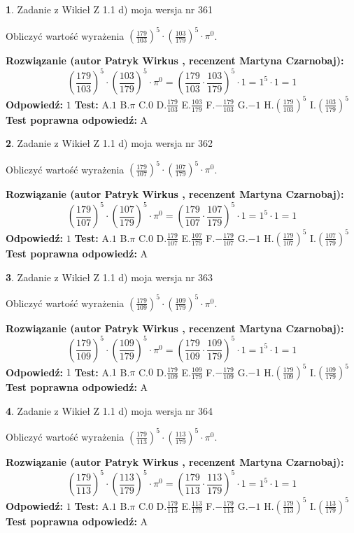 \documentclass[12pt, a4paper]{article}
\theoremstyle{definition} %
\newtheorem{zad}{}
\newcommand{\zadStart}[1]{\begin{zad}#1\newline}
\newcommand{\zadStop}{\end{zad}}
\newcommand{\rozwStart}[2]{\noindent \textbf{Rozwiązanie (autor #1 , recenzent #2): }\newline}
\newcommand{\rozwStop}{\newline}
\newcommand{\odpStart}{\noindent \textbf{Odpowiedź:}\newline}
\newcommand{\odpStop}{\newline}
\newcommand{\testStart}{\noindent \textbf{Test:}\newline}
\newcommand{\testStop}{\newline}
\newcommand{\kluczStart}{\noindent \textbf{Test poprawna odpowiedź:}\newline}
\newcommand{\kluczStop}{\newline}
\begin{document}
\zadStart{Zadanie z Wikieł Z 1.1 d) moja wersja nr 361}

Obliczyć wartość wyrażenia $(\frac{179}{103})^{5} \cdot (\frac{103}{179})^{5} \cdot \pi^{0}$.
\zadStop
\rozwStart{Patryk Wirkus}{Martyna Czarnobaj}
$$(\frac{179}{103})^{5} \cdot (\frac{103}{179})^{5} \cdot \pi^{0} = (\frac{179}{103} \cdot \frac{103}{179})^{5} \cdot 1 = 1^{5} \cdot 1 = 1$$
\rozwStop
\odpStart
$1$
\odpStop
\testStart
A.$1$ B.$\pi$ C.$0$ D.$\frac{179}{103}$ E.$\frac{103}{179}$
F.$-\frac{179}{103}$ G.$-1$
H.$(\frac{179}{103})^{5}$
I.$(\frac{103}{179})^{5}$
\testStop
\kluczStart
A
\kluczStop



\zadStart{Zadanie z Wikieł Z 1.1 d) moja wersja nr 362}

Obliczyć wartość wyrażenia $(\frac{179}{107})^{5} \cdot (\frac{107}{179})^{5} \cdot \pi^{0}$.
\zadStop
\rozwStart{Patryk Wirkus}{Martyna Czarnobaj}
$$(\frac{179}{107})^{5} \cdot (\frac{107}{179})^{5} \cdot \pi^{0} = (\frac{179}{107} \cdot \frac{107}{179})^{5} \cdot 1 = 1^{5} \cdot 1 = 1$$
\rozwStop
\odpStart
$1$
\odpStop
\testStart
A.$1$ B.$\pi$ C.$0$ D.$\frac{179}{107}$ E.$\frac{107}{179}$
F.$-\frac{179}{107}$ G.$-1$
H.$(\frac{179}{107})^{5}$
I.$(\frac{107}{179})^{5}$
\testStop
\kluczStart
A
\kluczStop



\zadStart{Zadanie z Wikieł Z 1.1 d) moja wersja nr 363}

Obliczyć wartość wyrażenia $(\frac{179}{109})^{5} \cdot (\frac{109}{179})^{5} \cdot \pi^{0}$.
\zadStop
\rozwStart{Patryk Wirkus}{Martyna Czarnobaj}
$$(\frac{179}{109})^{5} \cdot (\frac{109}{179})^{5} \cdot \pi^{0} = (\frac{179}{109} \cdot \frac{109}{179})^{5} \cdot 1 = 1^{5} \cdot 1 = 1$$
\rozwStop
\odpStart
$1$
\odpStop
\testStart
A.$1$ B.$\pi$ C.$0$ D.$\frac{179}{109}$ E.$\frac{109}{179}$
F.$-\frac{179}{109}$ G.$-1$
H.$(\frac{179}{109})^{5}$
I.$(\frac{109}{179})^{5}$
\testStop
\kluczStart
A
\kluczStop



\zadStart{Zadanie z Wikieł Z 1.1 d) moja wersja nr 364}

Obliczyć wartość wyrażenia $(\frac{179}{113})^{5} \cdot (\frac{113}{179})^{5} \cdot \pi^{0}$.
\zadStop
\rozwStart{Patryk Wirkus}{Martyna Czarnobaj}
$$(\frac{179}{113})^{5} \cdot (\frac{113}{179})^{5} \cdot \pi^{0} = (\frac{179}{113} \cdot \frac{113}{179})^{5} \cdot 1 = 1^{5} \cdot 1 = 1$$
\rozwStop
\odpStart
$1$
\odpStop
\testStart
A.$1$ B.$\pi$ C.$0$ D.$\frac{179}{113}$ E.$\frac{113}{179}$
F.$-\frac{179}{113}$ G.$-1$
H.$(\frac{179}{113})^{5}$
I.$(\frac{113}{179})^{5}$
\testStop
\kluczStart
A
\kluczStop
\end{document}
